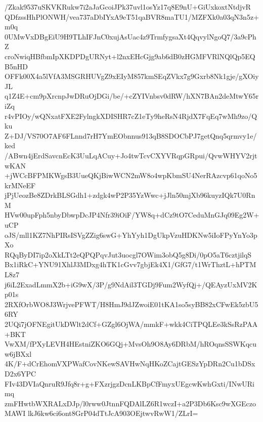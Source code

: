/Zkak9537uSKVKRukw7i2aJaGcoiJPk37uvl1osYz17q8E9nU+GiUxkoxtNtdjvR
QDfzssHhPlONWH/vea737aDbIYxA9eT51qaBVR8maTU1/MZFXk0a03qN3n5z+m0q
0UMwVxDBgEiU9H9TLhIFJnC0xujAsUac4z9TrmfygsaXt4QqvylNgoQ7/3a9cPhZ
croNwiqHBfbmIpXKDPDgURNyt+l2nxEHcGjg9ab6dB0zHGMFVRlNQlQp5EQB5nHD
OFFk00X4a5lVfA3MSGRHUVgZ9xEIyM857kmSEqZVkx7g9Gxrb8Nk1gje/gXOiyJL
q1Z4E+cm9pXrcnpJwDRuOjDGi/be/+cZYIVnbsv0dRW/hXN7BAn2deMtwY65riZq
r4vPIOy/wQNxatFXE2FylngkXDISHR7cZ1eTy9heRsN4RjdX7FqEq7wMh9zo/Qku
Z+DJ/VS70O7AF6FLnnd7rH7YmEObnnus913qB8SDOCbPJ7getQnq5qrmvy1e/ked
/ABwn4jErdSavcnEcK3UuLqACuy+Jo4twTcvCXYVRqpGRpui/QvwWHYV2rjtwKAN
+jWCcBFPMKWgsB3UueQKjBiwWCN2mW8o4wpKbmSU4NerRAzcvp61qoNo5krMNeEF
jPjUeozBe8ZDrkBLSGdh1+zdgk4wP2P35YzWwc+jJln50mjXb96kuyzIQk7U0RnM
HVw00upFph5nbyDbwpDcJP4Nfr39iOiF/YW8q+dCz9tO7CeduMnGJq09Eg2W+uCP
oJS/mll1KZ7NhPIRsISVgZZig6swG+YhYyh1DgUkpVzuHDKNw5iIoFPyYnYo3pXo
RQqByDI7ip2oXkLTt2eQPQPqvJut3uocgl7OWim3obQ5g8Di/0pO5aT6cztjilqS
Bx1iRkC+YNU91XhlJ3MDxg4hTK1cGvv7gbjEk4X1/GfG7/t1WrThztL+hPTML8z7
j6iL2ExadLmmX2b+iG9wX/3P/g9NdAil3TGDj9Fum2WyfQj+/QEAyzUxMV2Kp01s
2RXfOrbWO8J3WrjvePFWT/H8HmJ9dJZwoiE01tKA1so5syBB82xCFwEk5zbU56RY
2UQi7jOFNEgitUkDWlt2dCf+GZgl6OjWA/mmkF+wkk4CiTPQLEe3kSsRzPAA+BKT
VwXM/fPXyLEVH4HEstniZKO6GQj+MvsOh9O8Ay6DRbM/hROqnsSSWKqcuw6jBXxl
4K/F+dCrEhomVXPWafCovNKewSAVHwNqHKoZCajtGESzYpDRn2Cu1bDSxD2x6YPC
FIv43DVIaQnruR9Jfq8r+g+FXzrjgzDcnLKBpCfFmyxUEgcwKwhGxti/INwURimq
zmFHwtbWXRALxDJp/l0rww0JtnnFQDAlLZ6R1wczI+a2P3Db6Ksc9wXGEczoMAWI
lkJ6kw6ci6ont8GrP04dTtJcA903OEjtwvRwW1/ZLrI=
